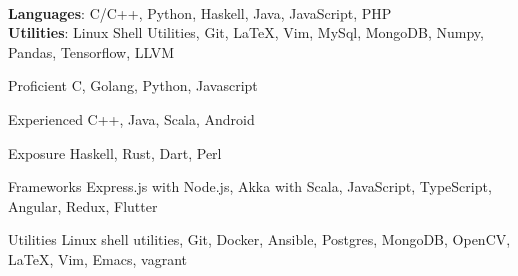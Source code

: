 \vspace{-0.2cm}
\ifdefined\ONEPAGE
\\
\vspace{-0.1cm}
\textbf{Languages}: C/C++, Python, Haskell, Java, JavaScript, PHP\\
\vspace{0.05cm}
\textbf{Utilities}: Linux Shell Utilities, Git, \LaTeX, Vim, MySql, MongoDB, Numpy, Pandas, Tensorflow, LLVM

\else
\begin{cvskills}

  \cvskill
  {Proficient}
  {C, Golang, Python, Javascript}

  \cvskill
  {Experienced}
  {C++, Java, Scala, Android}
  
  \cvskill
  {Exposure}
  {Haskell, Rust, Dart, Perl}
  
  \cvskill
  {Frameworks}
  {Express.js with Node.js, Akka with Scala, JavaScript, TypeScript, Angular,
    Redux, Flutter}

  \cvskill
  {Utilities}
  {Linux shell utilities, Git, Docker, Ansible, Postgres,
    MongoDB, OpenCV, \LaTeX, Vim, Emacs, vagrant}

\end{cvskills}
\fi
